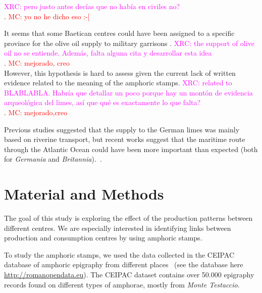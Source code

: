 \documentclass[review]{elsarticle}
\newcommand{\memo}[2]{\textcolor{#1}{#2}}
\newcommand{\maria}[1]{\memo{red}{MC: #1\\}}
\newcommand{\xavi}[1]{\memo{magenta}{XRC: #1\\}}
\begin{document}
\xavi{pero justo antes decías que no había en civiles no?}. 
\maria{yo no he dicho eso :-[}


It seems that some Baetican centres could have been assigned to a specific province for the olive oil supply to military garrisons \citep[125]{remesal_concierto}. 
\xavi{the support of olive oil no se entiende. Además, falta alguna cita y desarrollar esta idea}. 
\maria{mejorado, creo}
However, this hypothesis is hard to assess given the current lack of written evidence related to the meaning of the amphoric stamps. 
\xavi{related to BLABLABLA. Habría que detallar un poco porque hay un montón de evidencia arqueológica del limes, así que qué es exactamente lo que falta?}. 
\maria{mejorado,creo}

Previous studies suggested that the supply to the German limes was mainly based on riverine transport, but recent works suggest that the maritime route through the Atlantic Ocean could have been more important than expected (both for \textit{Germania} and \textit{Britannia}).~\citep{remesal_germn_2010,rubio-campillo_ecology_2018}.



\section{Material and Methods}


The goal of this study is exploring the effect of the production patterns between different centres. We are especially interested in identifying links between production and consumption centres by using amphoric stamps. 


To study the amphoric stamps, we used the data collected in the CEIPAC database of amphoric epigraphy from different places~\citep{remesal_centro_2015} (see the database here \url{http://romanopendata.eu}). The CEIPAC dataset contains over 50.000 epigraphy records found on different types of amphorae, mostly from \textit{Monte Testaccio}. 

\end{document}

